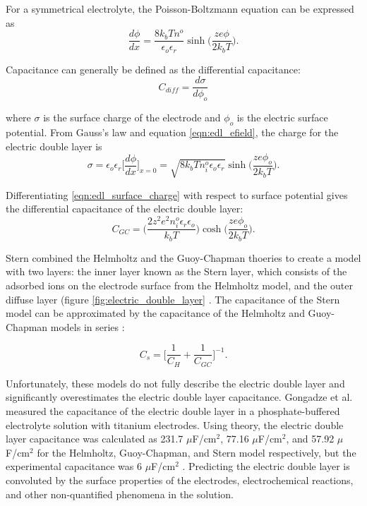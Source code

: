 \noindent For a symmetrical electrolyte, the Poisson-Boltzmann equation can be expressed as
\begin{equation}
    \frac{d\phi}{dx} = \frac{8k_bTn^o}{\epsilon_o\epsilon_r}\sinh\Big(\frac{ze\phi}{2k_bT}\Big).
    \label{eqn:edl_efield}
\end{equation}

\noindent Capacitance can generally be defined as the differential capacitance:
\begin{equation}
    C_{diff} = \frac{d\sigma}{d\phi_o}
\end{equation}

\noindent where $\sigma$ is the surface charge of the electrode and $\phi_o$ is the electric surface potential. From Gauss's law and equation \ref{eqn:edl_efield}, the charge for the electric double layer is
\begin{equation}
    \sigma = \epsilon_o\epsilon_r \Big[\frac{d\phi}{dx}\Big]_{x=0} = \sqrt{8k_bTn_i^o\epsilon_o\epsilon_r}\sinh\Big(\frac{ze\phi_o}{2k_bT}\Big).
    \label{eqn:edl_surface_charge}
\end{equation}

\noindent Differentiating \ref{eqn:edl_surface_charge} with respect to surface potential gives the differential capacitance of the electric double layer:
\begin{equation}
    C_{GC} = \Big(\frac{2z^2e^2n_i^o\epsilon_r\epsilon_o}{k_bT}\Big)\cosh\Big(\frac{ze\phi_o}{2k_bT}\Big).
\end{equation}

\par Stern combined the Helmholtz and the Guoy-Chapman thoeries to create a model with two layers: the inner layer known as the Stern layer, which consists of the adsorbed ions on the electrode surface from the Helmholtz model, and the outer diffuse layer (figure \ref{fig:electric_double_layer} \cite{_jes2011.pdf_????}. The capacitance of the Stern model can be approximated by the capacitance of the Helmholtz and Guoy-Chapman models in series \cite{_gongadze.pdf_????}:

\begin{equation}
    C_s = \bigg[ \frac{1}{C_H} + \frac{1}{C_{GC}}\bigg]^{-1}.
\end{equation}

\par Unfortunately, these models do not fully describe the electric double layer and significantly overestimates the electric double layer capacitance. Gongadze et al. measured the capacitance of the electric double layer in a phosphate-buffered electrolyte solution with titanium electrodes. Using theory, the electric double layer capacitance was calculated as 231.7 $\mu$F/cm$^2$, 77.16 $\mu$F/cm$^2$, and 57.92 $\mu$F/cm$^2$ for the Helmholtz, Guoy-Chapman, and Stern model respectively, but the experimental capacitance was 6 $\mu$F/cm$^2$ \cite{_gongadze.pdf_????}. Predicting the electric double layer is convoluted by the surface properties of the electrodes, electrochemical reactions, and other non-quantified phenomena in the solution. 

